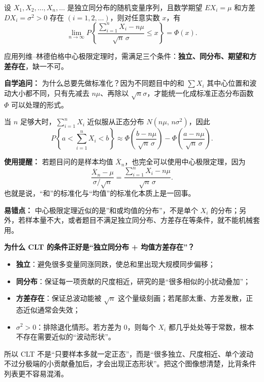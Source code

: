 ﻿\documentclass[lang=cn,11pt]{elegantbook}
\begin{document}
\begin{theorem}[列维--林德伯格中心极限定理] \label{thm:levy-lindberg}
设 \(X_1, X_2, \dots, X_n, \dots\) 是独立同分布的随机变量序列，且数学期望 \(EX_i = \mu\) 和方差 \(DX_i = \sigma^2 > 0\) 存在 \((i = 1, 2, \dots)\)，则对任意实数 \(x\)，有
\[
\lim_{n\to\infty} P\!\left\{\frac{\sum_{i=1}^{n} X_i - n\mu}{\sqrt{n}\,\sigma} \leq x\right\} = \Phi(x).
\]
\end{theorem}

\begin{note}
应用列维--林德伯格中心极限定理时，需满足三个条件：\textbf{独立、同分布、期望和方差存在}，缺一不可。

\textbf{自学追问：} 为什么总要先做标准化？因为不同题目中的和 \(\sum X_i\) 其中心位置和波动大小都不同，只有先减去 \(n\mu\)、再除以 \(\sqrt{n}\sigma\)，才能统一化成标准正态分布函数 \(\Phi\) 可以处理的形式。

当 \(n\) 足够大时，\(\displaystyle\sum_{i=1}^{n} X_i\) 近似服从正态分布 \(N(n\mu,\, n\sigma^2)\)，因此
\[
P\!\left\{a < \sum_{i=1}^{n} X_i < b\right\} \approx \Phi\!\left(\frac{b - n\mu}{\sqrt{n}\,\sigma}\right) - \Phi\!\left(\frac{a - n\mu}{\sqrt{n}\,\sigma}\right).
\]

\textbf{使用提醒：} 若题目问的是样本均值 \(\overline{X}_n\)，也完全可以使用中心极限定理，因为
\[
\frac{\overline{X}_n-\mu}{\sigma/\sqrt{n}}
=\frac{\sum_{i=1}^n X_i-n\mu}{\sqrt{n}\,\sigma}.
\]
也就是说，“和”的标准化与“均值”的标准化本质上是一回事。

\textbf{易错点：} 中心极限定理近似的是”和或均值的分布”，不是单个 \(X_i\) 的分布；另外，若样本量不大，或者题目不满足独立同分布、方差存在等条件，就不能机械套用。
\end{note}

\begin{note}
\textbf{为什么 CLT 的条件正好是“独立同分布 + 均值方差存在”？}
\begin{itemize}
    \item \textbf{独立}：避免很多变量同涨同跌，使总和里出现大规模同步偏移；
    \item \textbf{同分布}：保证每一项贡献的尺度相近，研究的是“很多相似的小扰动叠加”；
    \item \textbf{方差存在}：保证总波动能被 \(\sqrt{n}\) 这个量级刻画；若尾部太重、方差发散，正态近似通常会失效；
    \item \textbf{\(\sigma^2>0\)}：排除退化情形。若方差为 0，则每个 \(X_i\) 都几乎处处等于常数，根本不存在需要近似的“波动形状”。
\end{itemize}

所以 CLT 不是“只要样本多就一定正态”，而是“很多独立、尺度相近、单个波动不过分极端的小贡献叠加后，才会出现正态形状”。把这个图像想清楚，比背条件列表更不容易混淆。
\end{note}
\end{document}
